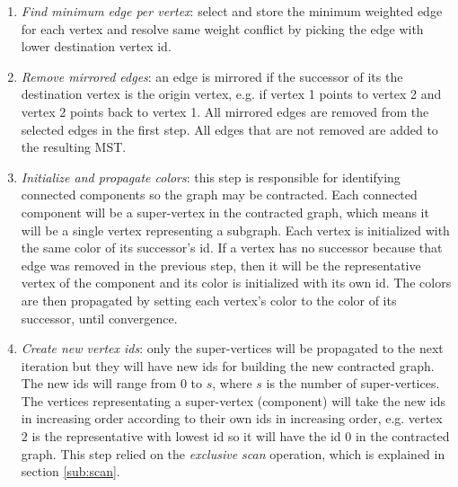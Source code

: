 \begin{enumerate}
	\item \emph{Find minimum edge per vertex}: select and store the minimum weighted edge for each vertex and resolve same weight conflict by picking the edge with lower destination vertex id.

	\item \emph{Remove mirrored edges}: an edge is mirrored if the successor of its the destination vertex is the origin vertex, e.g. if vertex 1 points to vertex 2 and vertex 2 points back to vertex 1.
	All mirrored edges are removed from the selected edges in the first step. All edges that are not removed are added to the resulting MST.

	\item \emph{Initialize and propagate colors}: this step is responsible for identifying connected components so the graph may be contracted.
	Each connected component will be a super-vertex in the contracted graph, which means it will be a single vertex representing a subgraph.
	Each vertex is initialized with the same color of its successor's id.
	If a vertex has no successor because that edge was removed in the previous step, then it will be the representative vertex of the component and its color is initialized with its own id.
	The colors are then propagated by setting each vertex's color to the color of its successor, until convergence.

	\item \emph{Create new vertex ids}: only the super-vertices will be propagated to the next iteration but they will have new ids for building the new contracted graph.
	The new ids will range from $0$ to $s$, where $s$ is the number of super-vertices.
	The vertices representating a super-vertex (component) will take the new ids in increasing order according to their own ids in increasing order, e.g. vertex $2$ is the representative with lowest id so it will have the id $0$ in the contracted graph.
	This step relied on the \emph{exclusive scan} operation, which is explained in section \ref{sub:scan}.


\end{enumerate}
